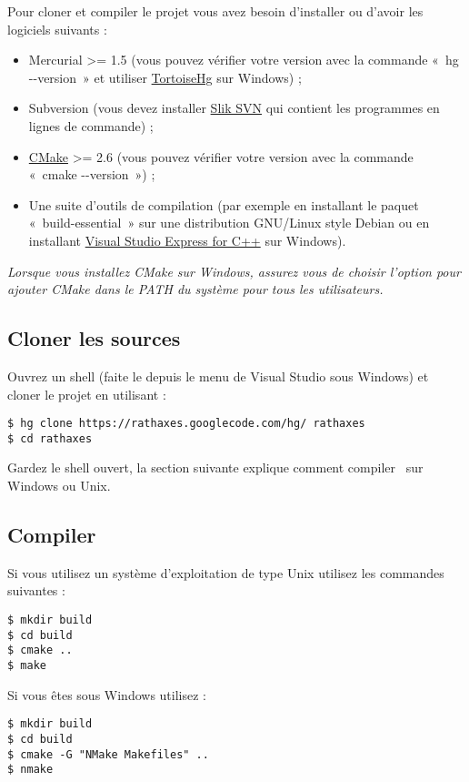 \documentclass[francais]{rtxarticle}
\begin{document}
Pour cloner et compiler le projet vous avez besoin d'installer ou d'avoir les
logiciels suivants :
\begin{itemize}
\item Mercurial >= 1.5 (vous pouvez vérifier votre version avec la commande
      «~hg {-}{-}version~» et utiliser
      \href{http://tortoisehg.bitbucket.org/download/index.html}{TortoiseHg}
      sur Windows) ;
\item Subversion (vous devez installer
      \href{http://www.sliksvn.com/en/download}{Slik SVN} qui contient les
      programmes en lignes de commande) ;
\item \href{http://www.cmake.org/cmake/resources/software.html}{CMake} >= 2.6
      (vous pouvez vérifier votre version avec la commande «~cmake {-}{-}version~») ;
\item Une suite d'outils de compilation (par exemple en installant le paquet
      «~build-essential~» sur une distribution GNU/Linux style Debian ou en
      installant
      \href{http://www.microsoft.com/express/Downloads/#2010-Visual-CPP}{Visual
      Studio Express for C++} sur Windows).
\end{itemize}

\emph{Lorsque vous installez CMake sur Windows, assurez vous de choisir
l'option pour ajouter CMake dans le PATH du système pour tous les
utilisateurs.}

\subsection{Cloner les sources}

Ouvrez un shell (faite le depuis le menu de Visual Studio sous Windows) et
cloner le projet en utilisant :

\begin{lstlisting}
$ hg clone https://rathaxes.googlecode.com/hg/ rathaxes
$ cd rathaxes
\end{lstlisting}

Gardez le shell ouvert, la section suivante explique comment compiler \rtx\ sur
Windows ou Unix.

\subsection{Compiler \rtx}

Si vous utilisez un système d'exploitation de type Unix utilisez les commandes
suivantes :

\begin{lstlisting}
$ mkdir build
$ cd build
$ cmake ..
$ make
\end{lstlisting}

Si vous êtes sous Windows utilisez :

\begin{lstlisting}
$ mkdir build
$ cd build
$ cmake -G "NMake Makefiles" ..
$ nmake
\end{lstlisting}

\rtxmaketitleblock
\end{document}
